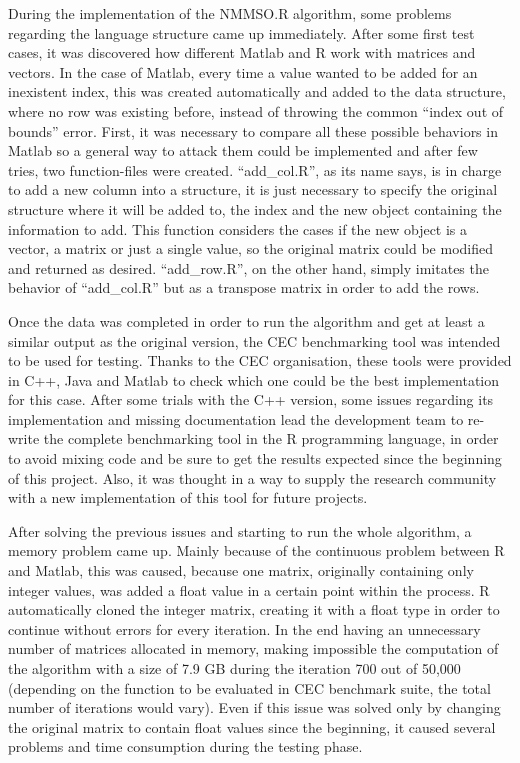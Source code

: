 \documentclass[12pt,a4paper]{article}
\begin{document}
During the implementation of the NMMSO.R algorithm, some problems
regarding the language structure came up immediately. After some first
test cases, it was discovered how different Matlab and R work with
matrices and vectors. In the case of Matlab, every time a value wanted
to be added for an inexistent index, this was created automatically and
added to the data structure, where no row was existing before, instead
of throwing the common ``index out of bounds'' error. First, it was
necessary to compare all these possible behaviors in Matlab so a general
way to attack them could be implemented and after few tries, two
function-files were created. ``add\_col.R'', as its name says, is in
charge to add a new column into a structure, it is just necessary to
specify the original structure where it will be added to, the index and
the new object containing the information to add. This function
considers the cases if the new object is a vector, a matrix or just a
single value, so the original matrix could be modified and returned as
desired. ``add\_row.R'', on the other hand, simply imitates the behavior
of ``add\_col.R'' but as a transpose matrix in order to add the rows.

Once the data was completed in order to run the algorithm and get at
least a similar output as the original version, the CEC benchmarking
tool was intended to be used for testing. Thanks to the CEC
organisation, these tools were provided in C++, Java and Matlab to check
which one could be the best implementation for this case. After some
trials with the C++ version, some issues regarding its implementation
and missing documentation lead the development team to re-write the
complete benchmarking tool in the R programming language, in order to
avoid mixing code and be sure to get the results expected since the
beginning of this project. Also, it was thought in a way to supply the
research community with a new implementation of this tool for future
projects.

After solving the previous issues and starting to run the whole
algorithm, a memory problem came up. Mainly because of the continuous
problem between R and Matlab, this was caused, because one matrix,
originally containing only integer values, was added a float value in a
certain point within the process. R automatically cloned the integer
matrix, creating it with a float type in order to continue without
errors for every iteration. In the end having an unnecessary number of
matrices allocated in memory, making impossible the computation of the
algorithm with a size of 7.9 GB during the iteration 700 out of 50,000
(depending on the function to be evaluated in CEC benchmark suite, the
total number of iterations would vary). Even if this issue was solved
only by changing the original matrix to contain float values since the
beginning, it caused several problems and time consumption during the
testing phase.
\end{document}
